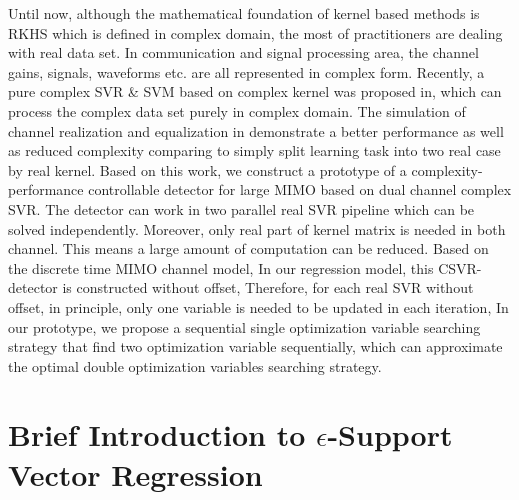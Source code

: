 \documentclass[12pt, draftclsnofoot, onecolumn]{IEEEtran}
\begin{document}
\begin{spacing}{2}
Until now, although the mathematical foundation of kernel based methods is RKHS which is defined in complex domain, the most of practitioners are dealing with real data set. In communication and signal processing area, the channel gains, signals, waveforms etc. are all represented in complex form. Recently, a pure complex SVR \& SVM based on complex kernel was proposed in\cite{bouboulis2013complex}, which can process the complex data set purely in complex domain. The simulation of channel realization and equalization in\cite{bouboulis2013complex} demonstrate a better performance as well as reduced complexity comparing to simply split learning task into two real case by real kernel.  
Based on this work, we construct a prototype of a complexity-performance controllable detector for large MIMO based on dual channel complex SVR. The detector can work in two parallel real SVR pipeline which can be solved independently. Moreover, only real part of kernel matrix is needed in both channel. This means a large amount of computation can be reduced.
Based on the discrete time MIMO channel model, In our regression model, this CSVR-detector
is constructed without offset, Therefore, for each real SVR without offset, in principle, only one variable is needed to be updated in each iteration, In our prototype, we propose a sequential single optimization variable searching strategy that find two optimization variable sequentially, which can approximate the optimal double optimization variables searching strategy. 
  



\section{Brief Introduction to $\epsilon$-Support Vector Regression}\label{Introduce epsilon SVR}

\end{spacing}
\end{document}
